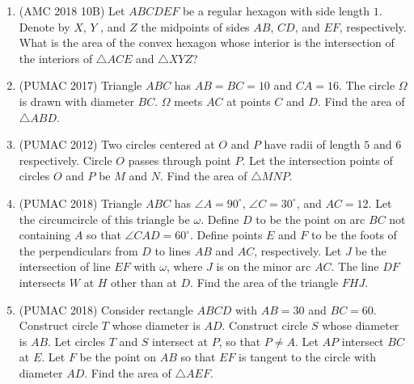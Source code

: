 \documentclass[12pt]{scrartcl}
\begin{document}
\begin{enumerate}
    \item (AMC 2018 10B) Let $ABCDEF$ be a regular hexagon with side length $1$. Denote by $X$, $Y$ , and $Z$ the midpoints of sides $AB$, $CD$, and $EF$, respectively. What is the area of the convex hexagon whose interior is the intersection of the interiors of $\triangle ACE$ and $\triangle XYZ$?


    \item (PUMAC 2017) Triangle $ABC$ has $AB = BC = 10$ and $CA = 16$. The circle $\Omega$ is drawn with diameter $BC$. $\Omega$ meets $AC$ at points $C$ and $D$. Find the area of $\triangle ABD$.


    \item (PUMAC 2012) Two circles centered at $O$ and $P$ have radii of length $5$ and $6$ respectively. Circle $O$ passes through point $P$. Let the intersection points of circles $O$ and $P$ be $M$ and $N$. Find the area of $\triangle MNP$.


    \item (PUMAC 2018) Triangle $ABC$ has $\angle A = 90^\circ$, $\angle C = 30^\circ$, and $AC = 12$. Let the circumcircle of this triangle be $\omega$. Define $D$ to be the point on arc $BC$ not containing $A$ so that $\angle CAD = 60^\circ$. Define points $E$ and $F$ to be the foots of the perpendiculars from $D$ to lines $AB$ and $AC$, respectively. Let $J$ be the intersection of line $EF$ with $\omega$, where $J$ is on the minor arc $AC$. The line $DF$ intersects $W$ at $H$ other than at $D$. Find the area of the triangle $FHJ$.


    \item (PUMAC 2018) Consider rectangle $ABCD$ with $AB = 30$ and $BC = 60$. Construct circle $T$ whose diameter is $AD$. Construct circle $S$ whose diameter is $AB$. Let circles $T$ and $S$ intersect at $P$, so that $P \neq A$. Let $AP$ intersect $BC$ at $E$. Let $F$ be the point on $AB$ so that $EF$ is tangent to the circle with diameter $AD$. Find the area of $\triangle AEF$.
\end{enumerate}
\end{document}
